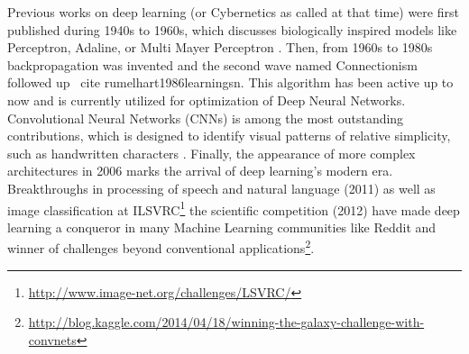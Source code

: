     Previous works on deep learning (or Cybernetics as called at that time) were first published during 1940s to 1960s, which discusses biologically inspired models like Perceptron, Adaline, or Multi Mayer Perceptron \cite{rosenblatt2000probabilistic, schmidhuber2015deep}. Then, from 1960s to 1980s backpropagation was invented and the second wave named Connectionism followed up \ cite {rumelhart1986learning}sn. This algorithm has been active up to now and is currently utilized for optimization of Deep Neural Networks. Convolutional Neural Networks (CNNs) is among the most outstanding contributions, which is designed to identify visual patterns of relative simplicity, such as handwritten characters \cite{lecun1995convolutional}. Finally, the appearance of more complex architectures in 2006 marks the arrival of deep learning’s modern era\cite{hinton2006fast,bengio2007greedy,huang2007unsupervised}. Breakthroughs in processing of speech and natural language (2011) as well as image classification at ILSVRC\footnote{\url{http://www.image-net.org/challenges/LSVRC/}} the scientific competition (2012) have made deep learning a conqueror in many Machine Learning communities like Reddit and winner of challenges beyond conventional applications\footnote{\url{http://blog.kaggle.com/2014/04/18/winning-the-galaxy-challenge-with-convnets}}. \\



